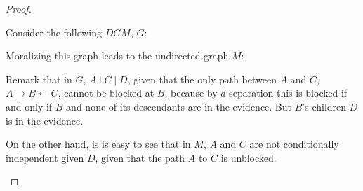 \documentclass{article}
\begin{document}
\begin{proof}
\begin{enumerate}
Consider the following $DGM$, $G$:

\begin{center}
\end{center}

Moralizing this graph leads to the undirected graph $M$:

 \begin{center}
\end{center}

Remark that in $G$, $A \bot C \mid D$, given that the only path between $A$ and $C$, $A \rightarrow B \leftarrow C$, cannot be blocked at $B$, because by $d$-separation this is blocked if and only if $B$ and none of its descendants are in the evidence. But $B$'s children $D$ is in the evidence.

On the other hand, is is easy to see that in $M$, $A$ and $C$ are not conditionally independent given $D$, given that the path $A$ to $C$ is unblocked. 



\end{enumerate}

\end{proof}
\end{document}
